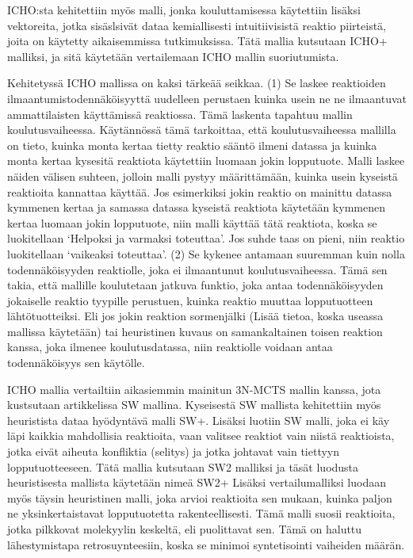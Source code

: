 \documentclass[finnish,twoside,censored,tkt,sw-line]{HYthesisML}
\begin{document}
ICHO:sta kehitettiin myös malli, jonka kouluttamisessa käytettiin lisäksi vektoreita, jotka sisäslsivät dataa kemiallisesti intuitiivisistä reaktio piirteistä, joita on käytetty aikaisemmissa tutkimuksissa.
Tätä mallia kutsutaan ICHO+ malliksi, ja sitä käytetään vertailemaan ICHO mallin suoriutumista.

Kehitetyssä ICHO mallissa on kaksi tärkeää seikkaa.
(1) Se laskee reaktioiden ilmaantumistodennäköisyyttä uudelleen perustaen kuinka usein ne ne ilmaantuvat ammattilaisten käyttämissä reaktiossa.
Tämä laskenta tapahtuu mallin koulutusvaiheessa.
Käytännössä tämä tarkoittaa, että koulutusvaiheessa mallilla on tieto, kuinka monta kertaa tietty reaktio sääntö ilmeni datassa ja kuinka monta kertaa kysesitä reaktiota käytettiin luomaan jokin lopputuote.
Malli laskee näiden välisen suhteen, jolloin malli pystyy määrittämään, kuinka usein kyseistä reaktioita kannattaa käyttää.
Jos esimerkiksi jokin reaktio on mainittu datassa kymmenen kertaa ja samassa datassa kyseistä reaktiota käytetään kymmenen kertaa luomaan jokin lopputuote, niin malli käyttää tätä reaktiota, koska se luokitellaan `Helpoksi ja varmaksi toteuttaa'.
Jos suhde taas on pieni, niin reaktio luokitellaan `vaikeaksi toteuttaa'.
(2) Se kykenee antamaan suuremman kuin nolla todennäköisyyden reaktiolle, joka ei ilmaantunut koulutusvaiheessa.
Tämä sen takia, että mallille koulutetaan jatkuva funktio, joka antaa todennäköisyyden jokaiselle reaktio tyypille perustuen, kuinka reaktio muuttaa lopputuotteen lähtötuotteiksi.
Eli jos jokin reaktion sormenjälki (Lisää tietoa, koska useassa mallissa käytetään) tai heuristinen kuvaus on samankaltainen toisen reaktion kanssa, joka ilmenee koulutusdatassa, niin reaktiolle voidaan antaa todennäköisyys sen käytölle.

ICHO mallia vertailtiin aikasiemmin mainitun 3N-MCTS mallin kanssa, jota kustsutaan artikkelissa SW mallina.
Kyseisestä SW mallista kehitettiin myös heuristista dataa hyödyntävä malli SW+.
Lisäksi luotiin SW malli, joka ei käy läpi kaikkia mahdollisia reaktioita, vaan valitsee reaktiot vain niistä reaktioista, jotka eivät aiheuta konfliktia (selitys) ja jotka johtavat vain tiettyyn lopputuotteeseen.
Tätä mallia kutsutaan SW2 malliksi ja täsät luodusta heuristisesta mallista käytetään nimeä SW2+
Lisäksi vertailumalliksi luodaan myös täysin heuristinen malli, joka arvioi reaktioita sen mukaan, kuinka paljon ne yksinkertaistavat lopputuotetta rakenteellisesti.
Tämä malli suosii reaktioita, jotka pilkkovat molekyylin keskeltä, eli puolittavat sen.
Tämä on haluttu lähestymistapa retrosuynteesiin, koska se minimoi syntetisointi vaiheiden määrän.
\end{document}

